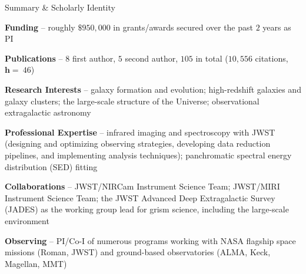 \documentclass{JMH_CV}
\begin{document}
\sloppy


\newcommand{\FirstAuthorCitationNumber}{$8$}
\newcommand{\SecondAuthorCitationNumber}{$5$}

\newcommand{\RefereedCitationCount}{$10{,}158$}
\newcommand{\RefereedCitationNumber}{$75$}
\newcommand{\RefereedIndexH}{$44$}

\newcommand{\TotalCitationCount}{$10{,}556$}
\newcommand{\TotalCitationNumber}{$105$}
\newcommand{\TotalIndexH}{$46$}

\newcommand{\DateOfLastUpdate}{15 November 2026}


\begin{rSection}{Summary \& Scholarly Identity}

\textbf{Funding} -- roughly {\boldmath$\$950{,}000$} in grants/awards secured over the past {\boldmath$2$} years as PI

\textbf{Publications} -- {\boldmath\FirstAuthorCitationNumber} first author, {\boldmath\SecondAuthorCitationNumber} second author, {\boldmath\TotalCitationNumber} in total ({\boldmath\TotalCitationCount} citations, $\bm{h} =\ ${\boldmath\TotalIndexH})

\textbf{Research Interests} -- galaxy formation and evolution; high-redshift galaxies and galaxy clusters; the large-scale structure of the Universe; observational extragalactic astronomy

\textbf{Professional Expertise} -- infrared imaging and spectroscopy with JWST (designing and optimizing observing strategies, developing data reduction pipelines, and implementing analysis techniques); panchromatic spectral energy distribution (SED) fitting

\textbf{Collaborations} -- JWST/NIRCam Instrument Science Team; JWST/MIRI Instrument Science Team; the JWST Advanced Deep Extragalactic Survey (JADES) as the working group lead for grism science, including the large-scale environment

\textbf{Observing} -- PI/Co-I of numerous programs working with NASA flagship space missions (Roman, JWST) and ground-based observatories (ALMA, Keck, Magellan, MMT)

\end{rSection}
\end{document}
